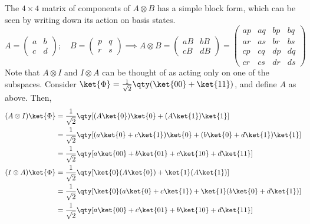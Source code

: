 The \( 4 \times 4 \) matrix of components of \( A \otimes B \) has a simple block form, which can be seen by writing down its action on basis states.
\[ A = \begin{pmatrix}
    a & b \\
    c & d
\end{pmatrix};\quad B = \begin{pmatrix}
    p & q \\
    r & s
\end{pmatrix} \implies A \otimes B = \begin{pmatrix}
    aB & bB \\
    cB & dB
\end{pmatrix} = \begin{pmatrix}
    ap & aq & bp & bq \\
    ar & as & br & bs \\
    cp & cq & dp & dq \\
    cr & cs & dr & ds
\end{pmatrix} \]
Note that \( A \otimes I \) and \( I \otimes A \) can be thought of as acting only on one of the subspaces.
Consider \( \ket{\Phi} = \frac{1}{\sqrt{2}} \qty(\ket{00} + \ket{11}) \), and define \( A \) as above.
Then,
\begin{align*}
    (A \otimes I) \ket{\Phi} &= \frac{1}{\sqrt{2}} \qty[(A \ket{0}) \ket{0} + (A \ket{1}) \ket{1}] \\
    &= \frac{1}{\sqrt{2}} \qty[(a \ket{0} + c \ket{1}) \ket{0} + (b \ket{0} + d \ket{1}) \ket{1}] \\
    &= \frac{1}{\sqrt{2}} \qty[a \ket{00} + b \ket{01} + c \ket{10} + d \ket{11}] \\
    (I \otimes A) \ket{\Phi} &= \frac{1}{\sqrt{2}} \qty[\ket{0} (A \ket{0}) + \ket{1} (A \ket{1})] \\
    &= \frac{1}{\sqrt{2}} \qty[\ket{0} (a \ket{0} + c \ket{1}) + \ket{1} (b \ket{0} + d \ket{1})] \\
    &= \frac{1}{\sqrt{2}} \qty[a \ket{00} + c \ket{01} + b \ket{10} + d \ket{11}]
\end{align*}


